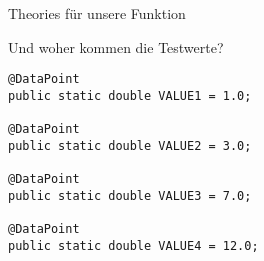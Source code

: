 \begin{frame}{Theories für unsere Funktion}



Und woher kommen die Testwerte?

\begin{lstlisting}
@DataPoint
public static double VALUE1 = 1.0;

@DataPoint
public static double VALUE2 = 3.0;

@DataPoint
public static double VALUE3 = 7.0;

@DataPoint
public static double VALUE4 = 12.0;
\end{lstlisting}

\end{frame}



